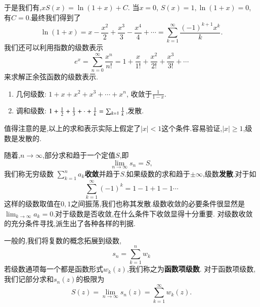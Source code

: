 于是我们有,$
    x S(x) = \ln (1 + x) + C .$
当$x=0$, $S(x) = 1, \ln (1+x) = 0$, 有$C=0$.最终我们得到了
\begin{equation}
    \ln (1+x) = x -  \frac{x^2}{2} + \frac{x^3}{3} - \frac{x^4}{4} + \cdots = \sum_{k=1}^{\infty} \frac{(-1)^{k+1} x^k}{k} .
\end{equation}
我们还可以利用指数的级数表示
\begin{equation}
    e^{x} = \sum_{n=0}^{\infty} \frac{x^n}{n!} = 1 + \frac{x}{1!} + \frac{x^2}{2!} + \frac{x^3}{3!} + \cdots 
\end{equation}
来求解正余弦函数的级数表示.
\begin{enumerate}
    \item 几何级数: $ 1 + x + x^2 + x^3 + \cdots + x^n$, 收敛于$\frac{1}{1-x}$.
    \item 调和级数: $ 1 + {\frac{1}{2}} + \frac{1}{3} + \cdot +\frac{1}{k} = \sum_{k=1} \frac{1}{k}$,发散.
\end{enumerate}

值得注意的是,以上的求和表示实际上假定了$|x|<1$这个条件.容易验证,$|x|\geq 1$,级数是发散的.

随着,$n\to \infty$,部分求和趋于一个定值$S$,即
\begin{equation}
    \lim_{n\to \infty} s_n = S ,
\end{equation}
我们称无穷级数 $\sum_{k=1}^{n} a_{k}${\bf 收敛}并趋于$S$.如果级数的求和趋于$\pm \infty$,级数{\bf 发散}.对于如
\begin{equation}
    \sum_{k=1}^{\infty} (-1)^k = 1 - 1 + 1 - 1 \cdots 
\end{equation}
这样的级数取值在$0,1$之间振荡,我们也称其发散.级数收敛的必要条件很显然是$\lim_{k\to \infty} a_k = 0$.对于级数是否收敛,在什么条件下收敛显得十分重要.
对级数收敛的充分条件寻找,派生出了各种各样的判据.

一般的,我们将复数的概念拓展到级数,
\begin{equation}
    s_n = \sum_{k=1}^{n} w_{k}
\end{equation}
若级数通项每一个都是函数形式$w_k(z)$,我们称之为\textbf{函数项级数}.
对于函数项级数,我们记部分求和$s_n(z)$的极限为
\begin{equation}
    S(z) = \lim_{n\to \infty} s_n(z) =  \sum_{k=1}^{\infty} w_k (z). 
\end{equation}


